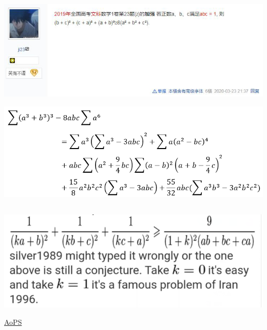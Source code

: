 \documentclass[UTF8]{ctexart}
\begin{document}
\subsection{}
\begin{center}
	\includegraphics[width=0.8\linewidth]{a33}
\end{center}
\begin{center}
	\includegraphics[width=0.8\linewidth]{a34}
\end{center}
\subsection{}
\begin{center}
	\includegraphics[width=0.5\linewidth]{a35}
\end{center}
\href{https://artofproblemsolving.com/community/q1h141869p802507}{AoPS}
\end{document}
